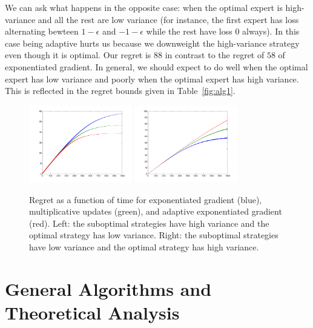\documentclass[11pt]{article}
\begin{document}
We can ask what happens in the opposite case: when the optimal expert is high-variance and all 
the rest are low variance (for instance, the first expert has loss alternating bewteen $1-\epsilon$ 
and $-1-\epsilon$ while the rest have loss $0$ always). In this case being adaptive hurts us because 
we downweight the high-variance strategy even though it is optimal. Our regret is $88$ in contrast 
to the regret of $58$ of exponentiated gradient. In general, we should expect to do well when the optimal 
expert has low variance and poorly when the optimal expert has high variance. This is reflected 
in the regret bounds given in Table~\ref{fig:alg1}.

\begin{figure}
        \begin{center}
                \includegraphics[width=0.4\textwidth]{simple.pdf} \includegraphics[width=0.4\textwidth]{tricky.pdf}
        \end{center}
        \caption{Regret as a function of time for exponentiated gradient (blue), multiplicative updates (green), and adaptive exponentiated gradient (red). Left: 
        the suboptimal strategies have high variance and the optimal strategy has low variance. Right: the suboptimal strategies have low variance and the 
        optimal strategy has high variance.}
        \label{fig:simple}
\end{figure}

\section{General Algorithms and Theoretical Analysis}
\end{document}
